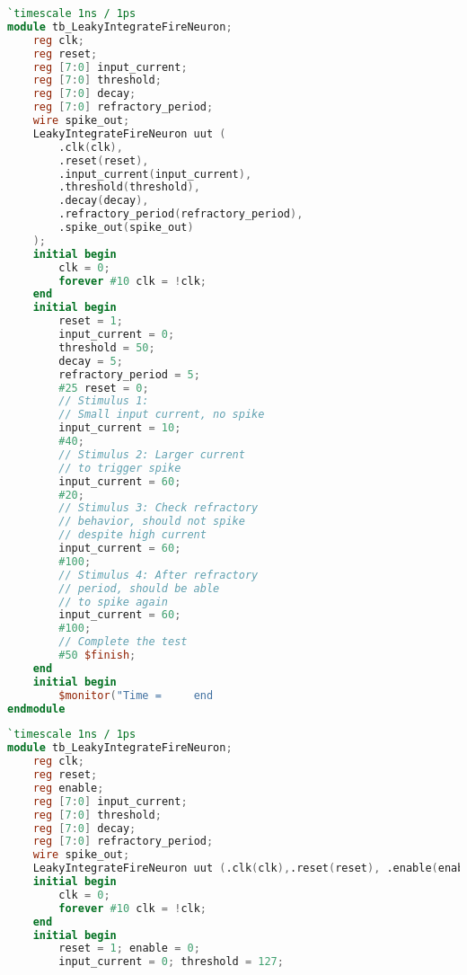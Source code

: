\begin{table*}[!htbp]
\centering
\caption{Test Bench for the LIF Spiking Neuron Verilog Module generated by ChatGPT}
\label{table:LIF_module_tb}

\begin{minipage}[t]{.49\textwidth}
\begin{lstlisting}[language=Verilog, caption={Initial Module}]
`timescale 1ns / 1ps
module tb_LeakyIntegrateFireNeuron;
    reg clk;
    reg reset;
    reg [7:0] input_current;
    reg [7:0] threshold;
    reg [7:0] decay;
    reg [7:0] refractory_period;
    wire spike_out;
    LeakyIntegrateFireNeuron uut (
        .clk(clk),
        .reset(reset),
        .input_current(input_current),
        .threshold(threshold),
        .decay(decay),
        .refractory_period(refractory_period),
        .spike_out(spike_out)
    );
    initial begin
        clk = 0;
        forever #10 clk = !clk;
    end
    initial begin
        reset = 1;
        input_current = 0;
        threshold = 50; 
        decay = 5;   
        refractory_period = 5;
        #25 reset = 0;
        // Stimulus 1:
        // Small input current, no spike
        input_current = 10;
        #40;
        // Stimulus 2: Larger current
        // to trigger spike
        input_current = 60;
        #20;
        // Stimulus 3: Check refractory
        // behavior, should not spike
        // despite high current
        input_current = 60;
        #100;
        // Stimulus 4: After refractory
        // period, should be able
        // to spike again
        input_current = 60;
        #100;
        // Complete the test
        #50 $finish;
    end
    initial begin
        $monitor("Time =     end
endmodule
\end{lstlisting}
\end{minipage}
\hfill
\begin{minipage}[t]{.49\textwidth}
\begin{lstlisting}[language=Verilog, caption={Final Module}]
`timescale 1ns / 1ps
module tb_LeakyIntegrateFireNeuron;
    reg clk;
    reg reset;
    reg enable;
    reg [7:0] input_current;
    reg [7:0] threshold;
    reg [7:0] decay;
    reg [7:0] refractory_period;
    wire spike_out;
    LeakyIntegrateFireNeuron uut (.clk(clk),.reset(reset), .enable(enable),.input_current(input_current),.threshold(threshold), .decay(decay), .refractory_period(refractory_period),.spike_out(spike_out));
    initial begin
        clk = 0;
        forever #10 clk = !clk;
    end
    initial begin
        reset = 1; enable = 0;
        input_current = 0; threshold = 127;

\end{lstlisting}
\end{minipage}
\end{table*}
